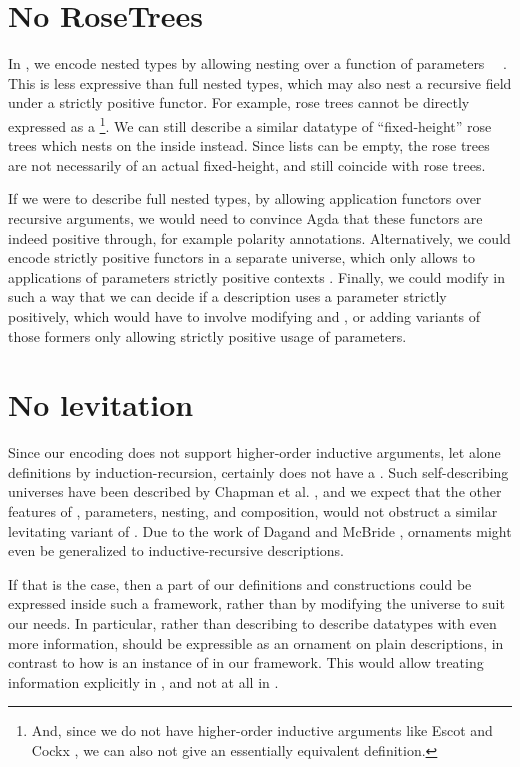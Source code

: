 \section{No RoseTrees}
In , we encode nested types by allowing nesting over a function of parameters \ \ . This is less expressive than full nested types, which may also nest a recursive field under a strictly positive functor. For example, rose trees
cannot be directly expressed as a \footnote{And, since we do not have higher-order inductive arguments like Escot and Cockx \cite{practgen}, we can also not give an essentially equivalent definition.}. We can still describe a similar datatype of ``fixed-height'' rose trees
which nests on the inside instead. Since lists can be empty, the rose trees are not necessarily of an actual fixed-height, and still coincide with rose trees.

If we were to describe full nested types, by allowing application functors over recursive arguments, we would need to convince Agda that these functors are indeed positive through, for example polarity annotations. Alternatively, we could encode strictly positive functors in a separate universe, which only allows to applications of parameters strictly positive contexts \cite{sijsling}. Finally, we could modify  in such a way that we can decide if a description uses a parameter strictly positively, which would have to involve modifying  and , or adding variants of those formers only allowing strictly positive usage of parameters.


\section{No levitation}
Since our encoding does not support higher-order inductive arguments, let alone definitions by induction-recursion,  certainly does not have a . Such self-describing universes have been described by Chapman et al. \cite{levitation}, and we expect that the other features of , parameters, nesting, and composition, would not obstruct a similar levitating variant of . Due to the work of Dagand and McBride \cite{orntrans}, ornaments might even be generalized to inductive-recursive descriptions.

If that is the case, then a part of our definitions and constructions could be expressed inside such a framework, rather than by modifying the universe to suit our needs. In particular, rather than describing  to describe datatypes with even more information,  should be expressible as an ornament on plain descriptions, in contrast to how  is an instance of  in our framework. This would allow treating information explicitly in , and not at all in .

